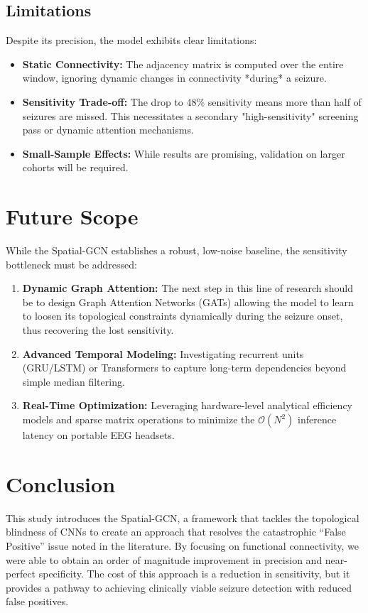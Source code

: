 \documentclass[journal]{IEEEtran}
\begin{document}
\subsection{Limitations}
Despite its precision, the model exhibits clear limitations:
\begin{itemize}
    \item \textbf{Static Connectivity:} The adjacency matrix is computed over the entire window, ignoring dynamic changes in connectivity *during* a seizure.
    \item \textbf{Sensitivity Trade-off:} The drop to 48\% sensitivity means more than half of seizures are missed. This necessitates a secondary "high-sensitivity" screening pass or dynamic attention mechanisms.
    \item \textbf{Small-Sample Effects:} While results are promising, validation on larger cohorts will be required.
\end{itemize}

\section{Future Scope}
While the Spatial-GCN establishes a robust, low-noise baseline, the sensitivity bottleneck must be addressed:
\begin{enumerate}
    \item \textbf{Dynamic Graph Attention:} The next step in this line of research should be to design Graph Attention Networks (GATs) allowing the model to learn to loosen its topological constraints dynamically during the seizure onset, thus recovering the lost sensitivity.
    \item \textbf{Advanced Temporal Modeling:} Investigating recurrent units (GRU/LSTM) or Transformers to capture long-term dependencies beyond simple median filtering.
    \item \textbf{Real-Time Optimization:} Leveraging hardware-level analytical efficiency models \cite{narendra2026} and sparse matrix operations to minimize the $\mathcal{O}(N^2)$ inference latency on portable EEG headsets.
\end{enumerate}

\enlargethispage{2\baselineskip}
\section{Conclusion}
This study introduces the Spatial-GCN, a framework that tackles the topological blindness of CNNs to create an approach that resolves the catastrophic ``False Positive'' issue noted in the literature. By focusing on functional connectivity, we were able to obtain an order of magnitude improvement in precision and near-perfect specificity. The cost of this approach is a reduction in sensitivity, but it provides a pathway to achieving clinically viable seizure detection with reduced false positives.
\end{document}
